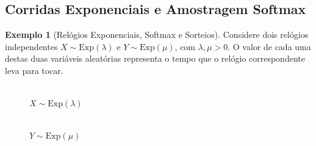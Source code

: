 \documentclass[12pt,portuguese]{article}
\theoremstyle{definition}
\newtheorem{example}[example]{Exemplo}
\theoremstyle{plainexercise}
\theoremstyle{starredexercise}
\theoremstyle{definition}
\begin{document}
\subsection{Corridas Exponenciais e Amostragem Softmax}\label{subsec:aplicacoes-softmax}

\begin{example}[Relógios Exponenciais, Softmax e Sorteios]\label{ex:corrida-exponenciais-softmax}
Considere dois relógios independentes $X\sim\mathrm{Exp}(\lambda)$ e
$Y\sim\mathrm{Exp}(\mu)$, com $\lambda,\mu>0$. O valor de cada uma destas
duas variáveis aleatórias representa o tempo que
o relógio correspondente leva para tocar.
\begin{figure}[H]
\centering
\begin{minipage}[t]{0.28\textwidth}
\centering

\\[0.3cm]
{\small $X\sim \mathrm{Exp}(\lambda)$}
\end{minipage}\hspace{2.6cm}%
\begin{minipage}[t]{0.28\textwidth}
\centering

\\[0.3cm]
{\small $Y\sim \mathrm{Exp}(\mu)$}
\end{minipage}
\label{fig:despertadores-tikz}
\end{figure}



\end{example}
\end{document}

